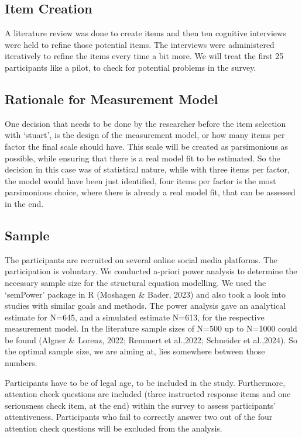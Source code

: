 \documentclass[
  12pt,
  a4paper,
  twoside]{article}
\begin{document}
\subsection{Item Creation}\label{item-creation}

A literature review was done to create items and then ten cognitive
interviews were held to refine those potential items. The interviews
were administered iteratively to refine the items every time a bit more.
We will treat the first 25 participants like a pilot, to check for
potential problems in the survey.

\subsection{Rationale for Measurement
Model}\label{rationale-for-measurement-model}

One decision that needs to be done by the researcher before the item
selection with `stuart', is the design of the measurement model, or how
many items per factor the final scale should have. This scale will be
created as parsimonious as possible, while ensuring that there is a real
model fit to be estimated. So the decision in this case was of
statistical nature, while with three items per factor, the model would
have been just identified, four items per factor is the most
parsimonious choice, where there is already a real model fit, that can
be assessed in the end.

\subsection{Sample}\label{sample}

The participants are recruited on several online social media platforms.
The participation is voluntary. We conducted a-priori power analysis to
determine the necessary sample size for the structural equation
modelling. We used the `semPower' package in R (Moshagen \& Bader, 2023)
and also took a look into studies with similar goals and methods. The
power analysis gave an analytical estimate for N=645, and a simulated
estimate N=613, for the respective measurement model. In the literature
sample sizes of N=500 up to N=1000 could be found (Algner \& Lorenz,
2022; Remmert et al.,2022; Schneider et al.,2024). So the optimal sample
size, we are aiming at, lies somewhere between those numbers.

Participants have to be of legal age, to be included in the study.
Furthermore, attention check questions are included (three instructed
response items and one seriousness check item, at the end) within the
survey to assess participants' attentiveness. Participants who fail to
correctly answer two out of the four attention check questions will be
excluded from the analysis.
\end{document}
